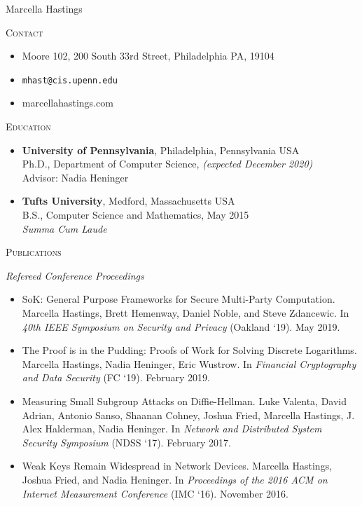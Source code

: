 \documentclass{article}
\begin{document}
Marcella Hastings

\hrulefill

\textsc{Contact}
\begin{itemize}[label={},noitemsep]
  \item Moore 102, 200 South 33rd Street, Philadelphia PA, 19104
  \item \texttt{mhast@cis.upenn.edu}
  \item marcellahastings.com
\end{itemize}

\textsc{Education}
\begin{itemize}[label={}]
  \item \textbf{University of Pennsylvania}, Philadelphia, Pennsylvania USA \\
    Ph.D., Department of Computer Science, \textit{(expected December 2020)}\\
    Advisor: Nadia Heninger 
    
  \item \textbf{Tufts University}, Medford, Massachusetts USA \\
    B.S., Computer Science and Mathematics, May 2015 \\
    \textit{Summa Cum Laude}
\end{itemize}

\textsc{Publications}

\textit{Refereed Conference Proceedings}
\begin{itemize}[label={}]
\item SoK: General Purpose Frameworks for Secure Multi-Party Computation. 
Marcella Hastings, Brett Hemenway, Daniel Noble, and Steve Zdancewic.
In \textit{40th IEEE Symposium on Security and Privacy} (Oakland `19). May 2019.
\item The Proof is in the Pudding: Proofs of Work for Solving Discrete Logarithms.
Marcella Hastings, Nadia Heninger, Eric Wustrow.
In \emph{Financial Cryptography and Data Security} (FC `19). February 2019.
\item Measuring Small Subgroup Attacks on Diffie-Hellman. 
Luke Valenta, David Adrian, Antonio Sanso, Shaanan Cohney, Joshua Fried, Marcella Hastings, J. Alex Halderman, Nadia Heninger. 
In \textit{Network and Distributed System Security Symposium} (NDSS `17). February 2017.
\item Weak Keys Remain Widespread in Network Devices. 
Marcella Hastings, Joshua Fried, and Nadia Heninger. 
In \textit{Proceedings of the 2016 ACM on Internet Measurement Conference} (IMC `16). November 2016.
\end{itemize}
\end{document}
